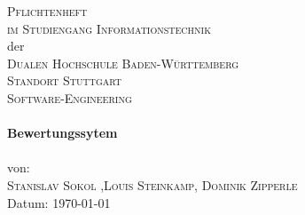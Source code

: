 
\begin{titlepage}
	
	\begin{center}
		
		\textsc{\LARGE Pflichtenheft}\\[2cm]
		\textsc{\large im Studiengang Informationstechnik}\\
		der\\
		\textsc{\large Dualen Hochschule Baden-Württemberg}\\
		\textsc{\large Standort Stuttgart}\\
		\textsc{\large Software-Engineering}\\[3.2cm]
		

		\HRule \\[0.4cm]
		{\huge \bfseries Bewertungssytem}\\[0.4cm]
		\HRule \\[0.1cm]
		\large von:\\ \textsc{Stanislav Sokol ,Louis Steinkamp, Dominik Zipperle}\\[0.2cm]
		Datum: \today
		\vspace{10.0cm}
			
	\end{center}

\end{titlepage}